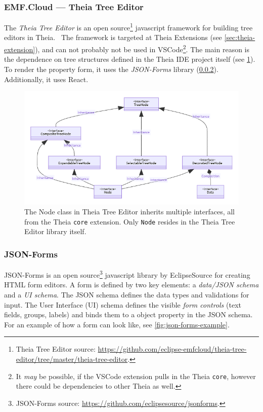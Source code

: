\subsubsection{EMF.Cloud --- Theia Tree Editor}
The \emph{Theia Tree Editor} is an \gls{open source}\footnote{Theia Tree Editor source: \href{https://github.com/eclipse-emfcloud/theia-tree-editor/tree/master/theia-tree-editor}{https://github.com/eclipse-emfcloud/theia-tree-editor/tree/master/theia-tree-editor}.} javascript framework for building tree editors in \gls{Theia}.~\cite{EclipseemfcloudTheiatreeeditor2020}
The framework is targeted at Theia Extensions (see \cref{sec:theia-extension}), and can not probably not be used in \gls{VSCode}\footnote{It \textit{may} be possible, if the VSCode extension pulls in the Theia \texttt{core}, however there could be dependencies to other \gls{Theia}  as well.}.
The main reason is the dependence on tree structures defined in the Theia \acrshort{IDE} project itself (see \cref{fig:theia-tree-editor-node}).
To render the property form, it uses the \emph{JSON-Forms} library (\cref{sec:json-forms}).
Additionally, it uses \gls{React}.

\begin{figure}[htbp]  %
  \centering
  \includegraphics[width=\textwidth]{figures/theia-tree-editor-node.png}
  \caption[Theia Tree Editor Node's Class Hierarchy]{The Node class in Theia Tree Editor inherits multiple interfaces, all from the Theia \texttt{core} extension. Only \texttt{Node} resides in the Theia Tree Editor library itself.}\label{fig:theia-tree-editor-node}
\end{figure}

\subsubsection{JSON-Forms}\label{sec:json-forms}
JSON-Forms is an \gls{open source}\footnote{JSON-Forms source: \href{https://github.com/eclipsesource/jsonforms}{https://github.com/eclipsesource/jsonforms}.} javascript library by EclipseSource for creating HTML form editors.
A form is defined by two key elements: a \emph{data/JSON schema} and a \emph{UI schema}.
The \gls{JSON} schema defines the data types and validations for input.
The User Interface (UI) schema defines the visible \emph{form controls} (text fields, groups, labels) and binds them to a object property in the JSON schema.~\cite{eclipsesourceJSONForms}
For an example of how a form can look like, see \cref{fig:json-forms-example}.

